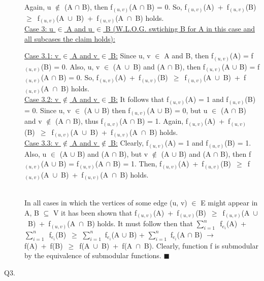 \documentclass[10pt]{csc_assignment}
\begin{document}
\begin{description}
{{Again, u $\notin$ (A $\cap$ B), then f$_{(u,v)}$(A $\cap$ B) = 0. So, \mbox{f$_{(u,v)}$(A) + f$_{(u,v)}$(B) $\geqslant$ f$_{(u,v)}$(A $\cup$ B) + f$_{(u,v)}$(A $\cap$ B)} holds.\\
}
\underline{Case 3: u $\in$ A and u $\in$ B (W.L.O.G. swtiching B for A in this case and all subcases the claim holds):}\\
\hspace*{1cm}\parbox{15cm}{\underline{Case 3.1: v $\in$ A and v $\in$ B:} Since u, v $\in$ A and B, then f$_{(u,v)}$(A) = f$_{(u,v)}$(B) = 0. Also, u, v $\in$ \mbox{(A $\cup$ B)} and (A $\cap$ B), then f$_{(u,v)}$(A $\cup$ B) = f$_{(u,v)}$(A $\cap$ B) = 0. So, \mbox{f$_{(u,v)}$(A) + f$_{(u,v)}$(B) $\geqslant$ f$_{(u,v)}$(A $\cup$ B) + f$_{(u,v)}$(A $\cap$ B)} holds.\\
\underline{Case 3.2: v $\notin$ A and v $\in$ B:} It follows that f$_{(u,v)}$(A) = 1 and f$_{(u,v)}$(B) = 0. Since u, v $\in$ (A $\cup$ B) then f$_{(u,v)}$(A $\cup$ B) = 0, but u $\in$ 
(A $\cap$ B) and v $\notin$ (A $\cap$ B), thus f$_{(u,v)}$(A $\cap$ B) = 1. Again, \mbox{f$_{(u,v)}$(A) + f$_{(u,v)}$(B) $\geqslant$ f$_{(u,v)}$(A $\cup$ B) + f$_{(u,v)}$(A $\cap$ B)} holds.\\
\underline{Case 3.3: v $\notin$ A and v $\notin$ B:} Clearly, f$_{(u,v)}$(A) = 1 and f$_{(u,v)}$(B) = 1. Also, u $\in$ (A $\cup$ B) and (A $\cap$ B), but v $\notin$ (A $\cup$ B) and (A $\cap$ B), then f$_{(u,v)}$(A $\cup$ B) = f$_{(u,v)}$(A $\cap$ B) = 1. Then, \mbox{f$_{(u,v)}$(A) + f$_{(u,v)}$(B) $\geqslant$ f$_{(u,v)}$(A $\cup$ B) + f$_{(u,v)}$(A $\cap$ B)} holds.
}
}\\
In all cases in which the vertices of some edge (u, v) $\in$ E might appear in A, B $\subseteq$ V it has been shown that \mbox{f$_{(u,v)}$(A) + f$_{(u,v)}$(B) $\geqslant$ f$_{(u,v)}$(A $\cup$ B) + f$_{(u,v)}$(A $\cap$ B)} holds. It must follow then that \mbox{$\sum_{i = 1}^{n}$ f$_{e_{i}}$(A) + $\sum_{i = 1}^{n}$ f$_{e_{i}}$(B) $\geqslant$} $\sum_{i = 1}^{n}$ f$_{e_{i}}$(A $\cup$ B) + $\sum_{i = 1}^{n}$ f$_{e_{i}}$(A $\cap$ B) $\rightarrow$ \mbox{f(A) + f(B) $\geqslant$ f(A $\cup$ B) + f(A $\cap$ B)}. Clearly, function f is submodular by the equivalence of submodular functions. $\blacksquare$


\newpage
\item[Q3.]


\end{description}
\end{document}
